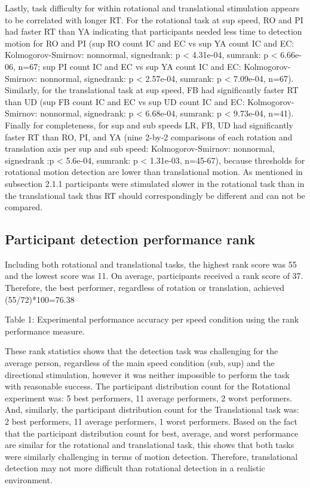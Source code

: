 \documentclass[11pt, onecolumn]{article}
\begin{document}
Lastly, task difficulty for within rotational and translational stimulation appears to be correlated with longer RT.  For the rotational task at sup speed, RO and PI had faster RT than YA indicating that participants needed less time to detection motion for RO and PI (sup RO count IC and EC vs sup YA count IC and EC: Kolmogorov-Smirnov: nonnormal, signedrank: p < 4.31e-04, sumrank: p < 6.66e-06, n=67; sup PI count IC and EC vs sup YA count IC and EC: Kolmogorov-Smirnov: nonnormal, signedrank: p < 2.57e-04, sumrank: p < 7.09e-04, n=67).  Similarly, for the translational task at sup speed, FB had significantly faster RT than UD (sup FB count IC and EC vs sup UD count IC and EC: Kolmogorov-Smirnov: nonnormal, signedrank: p < 6.68e-04, sumrank: p < 9.73e-04, n=41).  Finally for completeness, for sup and sub speeds LR, FB, UD had significantly faster RT than RO, PI, and YA (nine 2-by-2 comparisons of each rotation and translation axis per sup and sub speed: Kolmogorov-Smirnov: nonnormal, signedrank :p < 5.6e-04, sumrank: p < 1.31e-03, n=45-67), because thresholds for rotational motion detection are lower than translational motion.  As mentioned in subsection 2.1.1 participants were stimulated slower in the rotational task than in the translational task thus RT should correspondingly be different and can not be compared.

\subsection{Participant detection performance rank}
Including both rotational and translational tasks, the highest rank score was 55 and the lowest score was 11.  On average, participants received a rank score of 37.  Therefore, the best performer, regardless of rotation or translation, achieved (55/72)*100=76.38%

Table 1: Experimental performance accuracy per speed condition using the rank performance measure.


These rank statistics shows that the detection task was challenging for the average person, regardless of the main speed condition (sub, sup) and the directional stimulation, however it was neither impossible to perform the task with reasonable success.  The participant distribution count for the Rotational experiment was: 5 best performers, 11 average performers, 2 worst performers. And, similarly, the participant distribution count for the Translational task was: 2 best performers, 11 average performers, 1 worst performers.  Based on the fact that the participant distribution count for best, average, and worst performance are similar for the rotational and translational task, this shows that both tasks were similarly challenging in terms of motion detection.  Therefore, translational detection may not more difficult than rotational detection in a realistic environment.
\end{document}
